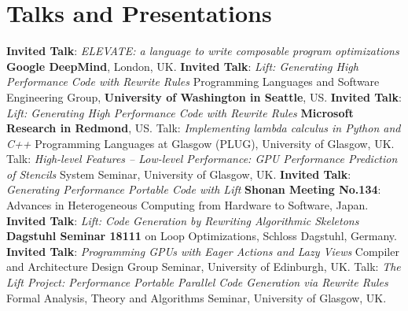 \documentclass[11pt,a4paper]{moderncv}
\newcommand{\strong}[1]{\textcolor{color1}{\textbf{#1}}}
\begin{document}
\section{Talks and Presentations}
  {\strong{Invited Talk}: \emph{ ELEVATE: a language to write composable program optimizations}\newline
  \small \strong{Google DeepMind}, London, UK.}
  {\strong{Invited Talk}: \emph{Lift: Generating High Performance Code with Rewrite Rules}\newline
  \small Programming Languages and Software Engineering Group, \strong{University of Washington in Seattle}, US.}
  {\strong{Invited Talk}: \emph{Lift: Generating High Performance Code with Rewrite Rules}\newline
    \small \strong{Microsoft Research in Redmond}, US.}
         {Talk: \emph{Implementing lambda calculus in Python and C++}\newline
          \small Programming Languages at Glasgow (PLUG), University of Glasgow, UK.}
         {Talk: \emph{High-level Features – Low-level Performance: GPU Performance Prediction of Stencils}\newline
          \small System Seminar, University of Glasgow, UK.}
         {\strong{Invited Talk}:
          \emph{Generating Performance Portable Code with Lift}\newline
         \small \strong{Shonan Meeting No.134}: Advances in Heterogeneous Computing from Hardware to Software, Japan.}
         {\strong{Invited Talk}:
          \emph{Lift: Code Generation by Rewriting Algorithmic Skeletons}\newline
         \small \strong{Dagstuhl Seminar 18111} on Loop Optimizations, Schloss Dagstuhl, Germany.}
         {\strong{Invited Talk}:\newline
          \emph{Programming GPUs with Eager Actions and Lazy Views}\newline
         \small Compiler and Architecture Design Group Seminar, University of Edinburgh, UK.}
         {Talk: \emph{The Lift Project: Performance Portable Parallel Code Generation via Rewrite Rules}\newline
         \small Formal Analysis, Theory and Algorithms Seminar, University of Glasgow, UK.}
\end{document}
